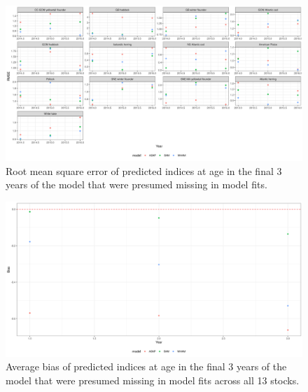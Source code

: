 \documentclass[12pt,letterpaper, leqno]{article}
\begin{document}
\begin{landscape}
\begin{figure}
\caption{Root mean square error of predicted indices at age in the final 3 years of the model that were presumed missing in model fits.}\label{predmissing_rmseplot}
\begin{center}
\includegraphics[height = 0.8\textheight]{../db/predmissing_rmseplot.png}
\end{center}
\end{figure}

\begin{figure}
\caption{Average bias of predicted indices at age in the final 3 years of the model that were presumed missing in model fits across all 13 stocks.}\label{predmissing_avgbiasplot}
\begin{center}
\includegraphics[height = 0.8\textheight]{../db/predmissing_avgbiasplot.png}
\end{center}
\end{figure}



\end{landscape}
\end{document}
